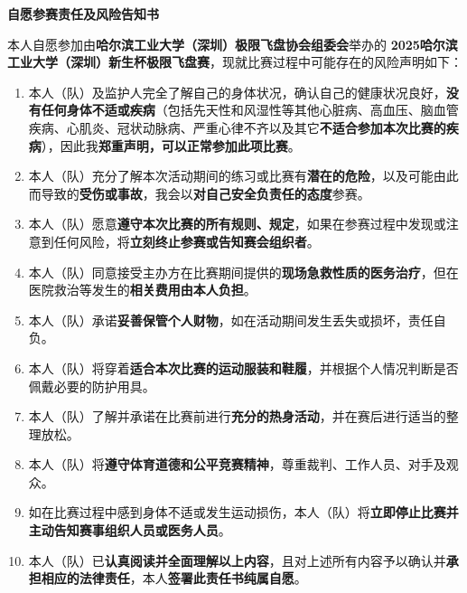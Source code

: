 \documentclass{article}
\begin{document}
\begin{center}
    \vspace*{-1.5cm} %
    {\fontsize{18pt}{28pt}\selectfont\textbf{自愿参赛责任及风险告知书}} %
    \vspace{0.5cm} %
\end{center}

本人自愿参加由\textbf{哈尔滨工业大学（深圳）极限飞盘协会组委会}举办的 \textbf{2025哈尔滨工业大学（深圳）新生杯极限飞盘赛}，现就比赛过程中可能存在的风险声明如下：

\begin{enumerate} %
\item 本人（队）及监护人完全了解自己的身体状况，确认自己的健康状况良好，\textbf{没有任何身体不适或疾病}（包括先天性和风湿性等其他心脏病、高血压、脑血管疾病、心肌炎、冠状动脉病、严重心律不齐以及其它\textbf{不适合参加本次比赛的疾病}），因此我\textbf{郑重声明，可以正常参加此项比赛}。
\item 本人（队）充分了解本次活动期间的练习或比赛有\textbf{潜在的危险}，以及可能由此而导致的\textbf{受伤或事故}，我会以\textbf{对自己安全负责任的态度}参赛。
\item 本人（队）愿意\textbf{遵守本次比赛的所有规则、规定}，如果在参赛过程中发现或注意到任何风险，将\textbf{立刻终止参赛或告知赛会组织者}。
\item 本人（队）同意接受主办方在比赛期间提供的\textbf{现场急救性质的医务治疗}，但在医院救治等发生的\textbf{相关费用由本人负担}。
\item 本人（队）承诺\textbf{妥善保管个人财物}，如在活动期间发生丢失或损坏，责任自负。
\item 本人（队）将穿着\textbf{适合本次比赛的运动服装和鞋履}，并根据个人情况判断是否佩戴必要的防护用具。
\item 本人（队）了解并承诺在比赛前进行\textbf{充分的热身活动}，并在赛后进行适当的整理放松。
\item 本人（队）将\textbf{遵守体育道德和公平竞赛精神}，尊重裁判、工作人员、对手及观众。
\item 如在比赛过程中感到身体不适或发生运动损伤，本人（队）将\textbf{立即停止比赛并主动告知赛事组织人员或医务人员}。
\item 本人（队）已\textbf{认真阅读并全面理解以上内容}，且对上述所有内容予以确认并\textbf{承担相应的法律责任}，本人\textbf{签署此责任书纯属自愿}。
\end{enumerate}
\end{document}
